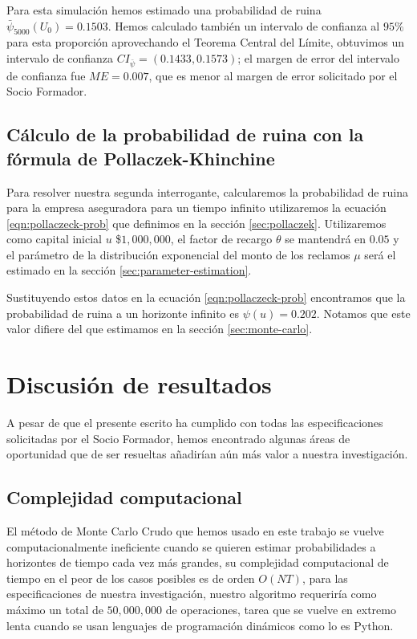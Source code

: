 \documentclass[journal]{IEEEtran}
\begin{document}
            Para esta simulación hemos estimado una probabilidad de ruina $\bar{\psi}_{5000}(U_0) = 0.1503$. Hemos calculado también un intervalo de confianza al $95\%$ para esta proporción aprovechando el Teorema Central del Límite, obtuvimos un intervalo de confianza ${CI}_{\bar{\psi}} = \left(0.1433, 0.1573\right)$; el margen de error del intervalo de confianza fue $ME = 0.007$, que es menor al margen de error solicitado por el Socio Formador.

        \subsection{Cálculo de la probabilidad de ruina con la fórmula de Pollaczek-Khinchine} \label{sec:analytic-sol}

            Para resolver nuestra segunda interrogante, calcularemos la probabilidad de ruina para la empresa aseguradora para un tiempo infinito utilizaremos la ecuación \ref{eqn:pollaczeck-prob} que definimos en la sección \ref{sec:pollaczek}. Utilizaremos como capital inicial $u$ \$$1,000,000$, el factor de recargo $\theta$ se mantendrá en $0.05$ y el parámetro de la distribución exponencial del monto de los reclamos $\mu$ será el estimado en la sección \ref{sec:parameter-estimation}.
            
            Sustituyendo estos datos en la ecuación \ref{eqn:pollaczeck-prob} encontramos que la probabilidad de ruina a un horizonte infinito es $\psi(u) = 0.202$. Notamos que este valor difiere del que estimamos en la sección \ref{sec:monte-carlo}.

    \section{Discusión de resultados} \label{sec:discussion}

        A pesar de que el presente escrito ha cumplido con todas las especificaciones solicitadas por el Socio Formador, hemos encontrado algunas áreas de oportunidad que de ser resueltas añadirían aún más valor a nuestra investigación.

        \subsection{Complejidad computacional}

            El método de Monte Carlo Crudo que hemos usado en este trabajo se vuelve computacionalmente ineficiente cuando se quieren estimar probabilidades a horizontes de tiempo cada vez más grandes, su complejidad computacional de tiempo en el peor de los casos posibles es de orden $O(NT)$, para las especificaciones de nuestra investigación, nuestro algoritmo requeriría como máximo un total de $50,000,000$ de operaciones, tarea que se vuelve en extremo lenta cuando se usan lenguajes de programación dinámicos como lo es Python.
\end{document}

